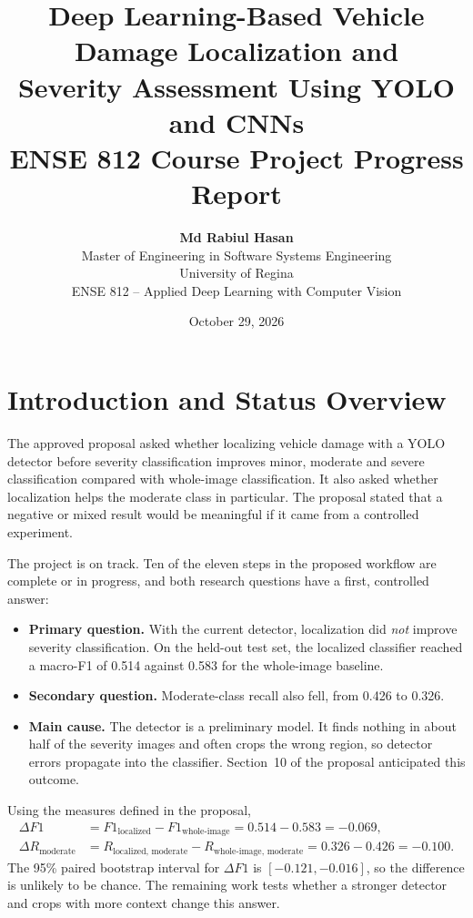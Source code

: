 \documentclass[11pt]{article}
\title{\textbf{Deep Learning-Based Vehicle Damage Localization and\\ Severity Assessment Using YOLO and CNNs}\\[6pt]
\large ENSE 812 Course Project Progress Report}
\author{\textbf{Md Rabiul Hasan}\\
Master of Engineering in Software Systems Engineering\\
University of Regina\\
ENSE 812 -- Applied Deep Learning with Computer Vision}
\date{October 29, 2026}
\begin{document}
\maketitle

\section{Introduction and Status Overview}

The approved proposal asked whether localizing vehicle damage with a YOLO detector before severity classification improves minor, moderate and severe classification compared with whole-image classification. It also asked whether localization helps the moderate class in particular. The proposal stated that a negative or mixed result would be meaningful if it came from a controlled experiment.

The project is on track. Ten of the eleven steps in the proposed workflow are complete or in progress, and both research questions have a first, controlled answer:

\begin{itemize}
  \item \textbf{Primary question.} With the current detector, localization did \emph{not} improve severity classification. On the held-out test set, the localized classifier reached a macro-F1 of 0.514 against 0.583 for the whole-image baseline.
  \item \textbf{Secondary question.} Moderate-class recall also fell, from 0.426 to 0.326.
  \item \textbf{Main cause.} The detector is a preliminary model. It finds nothing in about half of the severity images and often crops the wrong region, so detector errors propagate into the classifier. Section~10 of the proposal anticipated this outcome.
\end{itemize}

Using the measures defined in the proposal,
\begin{align}
\Delta F1 &= F1_{\text{localized}} - F1_{\text{whole-image}} = 0.514 - 0.583 = -0.069, \\
\Delta R_{\text{moderate}} &= R_{\text{localized, moderate}} - R_{\text{whole-image, moderate}} = 0.326 - 0.426 = -0.100.
\end{align}
The 95\% paired bootstrap interval for $\Delta F1$ is $[-0.121, -0.016]$, so the difference is unlikely to be chance. The remaining work tests whether a stronger detector and crops with more context change this answer.
\end{document}
